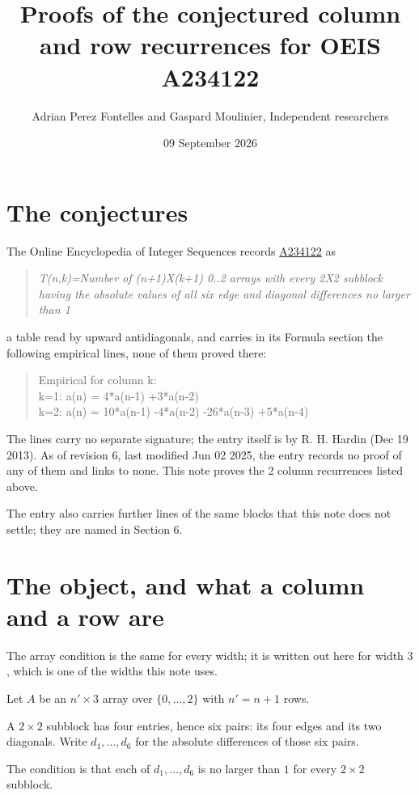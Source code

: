 \documentclass[11pt]{article}
\title{Proofs of the conjectured column and row recurrences for OEIS A234122}
\author{Adrian Perez Fontelles and Gaspard Moulinier, Independent researchers}
\date{09 September 2026}
\theoremstyle{definition}
\begin{document}
\maketitle
\section{The conjectures}

The Online Encyclopedia of Integer Sequences records \href{https://oeis.org/A234122}{A234122} as

\begin{quote}\itshape T(n,k)=Number of (n+1)X(k+1) 0..2 arrays with every 2X2 subblock having the absolute values of all six edge and diagonal differences no larger than 1\end{quote}

a table read by upward antidiagonals, and carries in its Formula section the following empirical lines, none of them proved there:

\begin{quote}\ttfamily Empirical for column k:\\
k=1: a(n) = 4*a(n-1) +3*a(n-2)\\k=2: a(n) = 10*a(n-1) -4*a(n-2) -26*a(n-3) +5*a(n-4)\end{quote}

The lines carry no separate signature; the entry itself is by R. H. Hardin (Dec 19 2013). As of revision 6, last modified Jun 02 2025, the entry records no proof of any of them and links to none. This note proves the 2 column recurrences listed above.

The entry also carries further lines of the same blocks that this note does not settle; they are named in Section 6.

\section{The object, and what a column and a row are}

The array condition is the same for every width; it is written out here for width $3$, which is one of the widths this note uses.

Let $A$ be an $n' \times 3$ array over $\{0,\dots,2\}$ with $n' = n + 1$ rows.

A $2\times2$ subblock has four entries, hence six pairs: its four edges and its two diagonals. Write $d_1,\dots,d_6$ for the absolute differences of those six pairs.

The condition is that each of $d_1,\dots,d_6$ is no larger than $1$ for every $2\times2$ subblock.
\end{document}
